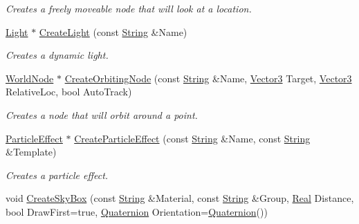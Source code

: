 \begin{DoxyCompactItemize}
\begin{DoxyCompactList}\small\item\em Creates a freely moveable node that will look at a location. \item\end{DoxyCompactList}\item 
\hyperlink{classMezzanine_1_1Light}{Light} $\ast$ \hyperlink{classMezzanine_1_1SceneManager_a33a91afe11a91a778d9b0139a06f3d0a}{CreateLight} (const \hyperlink{namespaceMezzanine_acf9fcc130e6ebf08e3d8491aebcf1c86}{String} \&Name)
\begin{DoxyCompactList}\small\item\em Creates a dynamic light. \item\end{DoxyCompactList}\item 
\hyperlink{classMezzanine_1_1WorldNode}{WorldNode} $\ast$ \hyperlink{classMezzanine_1_1SceneManager_a227c6534ea2c4fb51a3174635e09eb58}{CreateOrbitingNode} (const \hyperlink{namespaceMezzanine_acf9fcc130e6ebf08e3d8491aebcf1c86}{String} \&Name, \hyperlink{classMezzanine_1_1Vector3}{Vector3} Target, \hyperlink{classMezzanine_1_1Vector3}{Vector3} RelativeLoc, bool AutoTrack)
\begin{DoxyCompactList}\small\item\em Creates a node that will orbit around a point. \item\end{DoxyCompactList}\item 
\hyperlink{classMezzanine_1_1ParticleEffect}{ParticleEffect} $\ast$ \hyperlink{classMezzanine_1_1SceneManager_a7c7e0b3f993c531bcdd9a6dd9135178d}{CreateParticleEffect} (const \hyperlink{namespaceMezzanine_acf9fcc130e6ebf08e3d8491aebcf1c86}{String} \&Name, const \hyperlink{namespaceMezzanine_acf9fcc130e6ebf08e3d8491aebcf1c86}{String} \&Template)
\begin{DoxyCompactList}\small\item\em Creates a particle effect. \item\end{DoxyCompactList}\item 
void \hyperlink{classMezzanine_1_1SceneManager_aaa3c4b8d15aa74c767a21d725de25ec7}{CreateSkyBox} (const \hyperlink{namespaceMezzanine_acf9fcc130e6ebf08e3d8491aebcf1c86}{String} \&Material, const \hyperlink{namespaceMezzanine_acf9fcc130e6ebf08e3d8491aebcf1c86}{String} \&Group, \hyperlink{namespaceMezzanine_a726731b1a7df72bf3583e4a97282c6f6}{Real} Distance, bool DrawFirst=true, \hyperlink{classMezzanine_1_1Quaternion}{Quaternion} Orientation=\hyperlink{classMezzanine_1_1Quaternion}{Quaternion}())

\end{DoxyCompactItemize}
